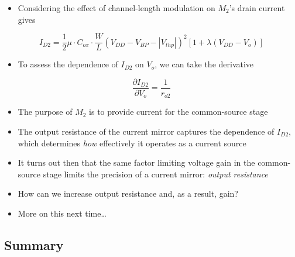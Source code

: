 \documentclass[11pt]{article}
\providecommand{\tightlist}{%
      \setlength{\itemsep}{0pt}\setlength{\parskip}{0pt}}
\begin{document}
    \begin{itemize}
\tightlist
\item
  Considering the effect of channel-length modulation on \(M_2\)'s drain
  current gives
\end{itemize}

\begin{equation}
I_{D2} = \dfrac{1}{2}\mu\cdot C_{ox} \cdot \dfrac{W}{L}(V_{DD}-V_{BP}-|V_{thp}|)^2[1+\lambda (V_{DD} - V_o) ]
\end{equation}

\begin{itemize}
\tightlist
\item
  To assess the dependence of \(I_{D2}\) on \(V_o\), we can take the
  derivative
\end{itemize}

\begin{equation}
\dfrac{\partial I_{D2}}{\partial V_o} = \dfrac{1}{r_{o2}}
\end{equation}

    \begin{itemize}
\tightlist
\item
  The purpose of \(M_2\) is to provide current for the common-source
  stage
\item
  The output resistance of the current mirror captures the dependence of
  \(I_{D2}\), which determines \emph{how} effectively it operates as a
  current source
\item
  It turns out then that the same factor limiting voltage gain in the
  common-source stage limits the precision of a current mirror:
  \emph{output resistance}
\item
  How can we increase output resistance and, as a result, gain?
\item
  More on this next time\ldots{}
\end{itemize}

    \hypertarget{summary}{%
\subsection{Summary}\label{summary}}
\end{document}
